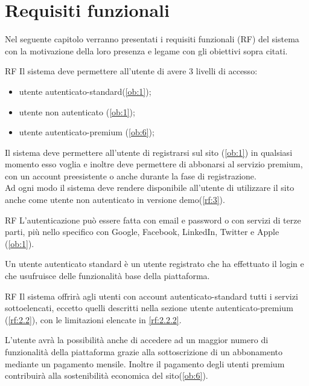 \section{Requisiti funzionali}
\label{sec:RequisitiFunzionali}

Nel seguente capitolo verranno presentati i requisiti funzionali (RF) del sistema con la motivazione della loro presenza e legame con gli obiettivi sopra citati.
\begin {listaPersonale}{RF}
Il sistema deve permettere all'utente di avere 3 livelli di accesso:
\begin{itemize}
	\item utente autenticato-standard(\ref{ob:1});
    \item utente non autenticato (\ref{ob:1}); 
    \item utente autenticato-premium (\ref{ob:6});
\end{itemize}
Il sistema deve permettere all'utente di registrarsi sul sito (\ref{ob:1}) in qualsiasi momento esso voglia e inoltre deve permettere di abbonarsi al servizio premium, con un account preesistente o anche durante la fase di registrazione.\\
Ad ogni modo il sistema deve rendere disponibile all'utente di utilizzare il sito anche come utente non autenticato in versione demo(\ref{rf:3}). 


\begin {listaPersonale2}{RF}
L'autenticazione può essere fatta con email e password o con servizi di terze parti, più nello specifico con Google, Facebook, LinkedIn, Twitter e Apple (\ref{ob:1}).
\end {listaPersonale2}


Un utente autenticato standard è un utente registrato che ha effettuato il login e che usufruisce delle funzionalità base della piattaforma.

\begin {listaPersonale2}{RF}
Il sistema offrirà agli utenti con account autenticato-standard tutti i servizi sottoelencati, eccetto quelli descritti nella sezione utente autenticato-premium (\ref{rf:2.2}), con le limitazioni elencate in \ref{rf:2.2.2}.

L’utente avrà la possibilità anche di accedere ad un maggior numero di funzionalità della piattaforma grazie alla sottoscrizione di un abbonamento mediante un pagamento mensile.
Inoltre il pagamento degli utenti premium contribuirà alla sostenibilità economica del sito(\ref{ob:6}).


\end{listaPersonale2}
\end{listaPersonale}
